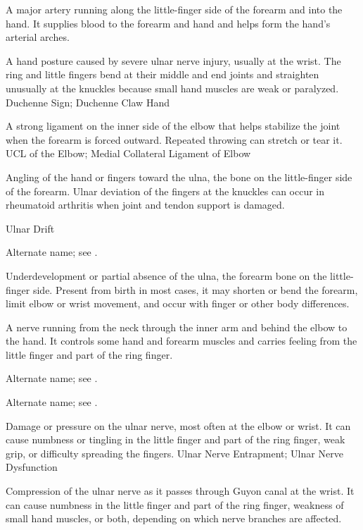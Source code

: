  A major artery running along the little-finger side of the forearm and into the hand. It supplies blood to the forearm and hand and helps form the hand’s arterial arches.

 A hand posture caused by severe ulnar nerve injury, usually at the wrist. The ring and little fingers bend at their middle and end joints and straighten unusually at the knuckles because small hand muscles are weak or paralyzed.
\synonyms
Duchenne Sign; Duchenne Claw Hand

 A strong ligament on the inner side of the elbow that helps stabilize the joint when the forearm is forced outward. Repeated throwing can stretch or tear it.
\synonyms
UCL of the Elbow; Medial Collateral Ligament of Elbow

 Angling of the hand or fingers toward the ulna, the bone on the little-finger side of the forearm. Ulnar deviation of the fingers at the knuckles can occur in rheumatoid arthritis when joint and tendon support is damaged.

\synonyms
Ulnar Drift

 Alternate name; see .

 Underdevelopment or partial absence of the ulna, the forearm bone on the little-finger side. Present from birth in most cases, it may shorten or bend the forearm, limit elbow or wrist movement, and occur with finger or other body differences.

 A nerve running from the neck through the inner arm and behind the elbow to the hand. It controls some hand and forearm muscles and carries feeling from the little finger and part of the ring finger.

 Alternate name; see .

 Alternate name; see .

 Damage or pressure on the ulnar nerve, most often at the elbow or wrist. It can cause numbness or tingling in the little finger and part of the ring finger, weak grip, or difficulty spreading the fingers.
\synonyms
Ulnar Nerve Entrapment; Ulnar Nerve Dysfunction

 Compression of the ulnar nerve as it passes through Guyon canal at the wrist. It can cause numbness in the little finger and part of the ring finger, weakness of small hand muscles, or both, depending on which nerve branches are affected.

